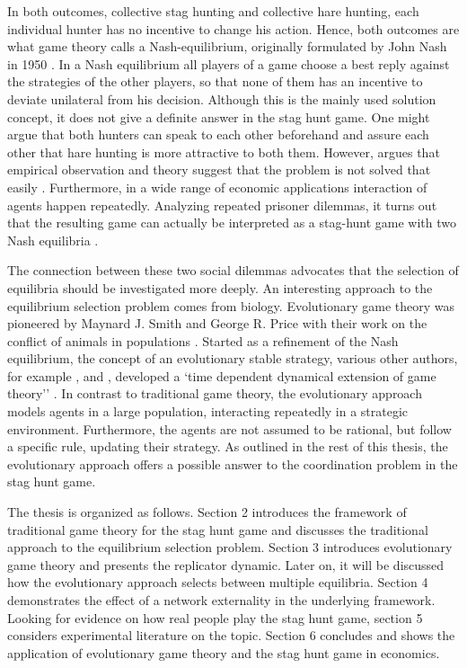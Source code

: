 In both outcomes, collective stag hunting and collective hare hunting,
each individual hunter has no incentive to change his action.
Hence, both outcomes are what game theory calls a Nash-equilibrium, originally
formulated by John Nash in 1950 \parencite{nash_equilibrium_1950}. In a 
Nash equilibrium all players of a game choose a best reply against
the strategies of the other players, so that none of them has an incentive
to deviate unilateral from his decision. Although this is the mainly used
solution concept, it does not give a definite answer in the stag hunt game.
One might argue that both hunters can speak to each other beforehand and
assure each other that hare hunting is more attractive to both them. 
However, \textcite{camerer_behavioral_2003}
argues that empirical observation and theory suggest that the problem is 
not solved that easily .
Furthermore, in a wide range of economic applications interaction of agents
happen repeatedly. Analyzing repeated prisoner dilemmas, it turns 
out that the resulting game can actually be interpreted as a stag-hunt game with
two Nash equilibria \parencite{skyrms_stag_2004}.

The connection between these two social dilemmas advocates that
the selection of equilibria should be investigated more deeply. 
An interesting approach to the equilibrium selection problem comes from
biology. Evolutionary game theory was pioneered by Maynard J. Smith and George
R. Price with their work on the conflict of animals in populations 
\parencite{smith_lhe_1973}. Started as a refinement of the Nash equilibrium,
the concept of an evolutionary stable strategy, various other authors, for 
example \textcite{taylor_evolutionary_1978}, \textcite{hofbauer_note_1979} and
\textcite{zeeman_dynamics_1981}, developed a `time dependent dynamical
extension of game theory'' \parencite[55]{hanauske_evolutionare_2011}.
In contrast to traditional game theory, the evolutionary approach  models
agents in a large population, interacting repeatedly in a strategic environment. 
Furthermore, the agents are not assumed to be rational, but follow a specific 
rule, updating their strategy. 
As outlined in the rest of this thesis, the
evolutionary approach offers a possible answer to the coordination
problem in the stag hunt game.

The thesis is organized as follows. Section 2 introduces the 
framework of traditional game theory for the stag hunt game and discusses
the traditional approach to the equilibrium selection problem. Section 3
introduces evolutionary game theory and presents the replicator dynamic. 
Later on, it will be discussed how the evolutionary approach selects
between multiple equilibria. Section 4 demonstrates the effect of a
network externality in the underlying framework. Looking for evidence on
how real people play the stag hunt game, section 5 considers experimental
literature on the topic. Section 6 concludes and shows the application of
evolutionary game theory and the stag hunt game in economics.

